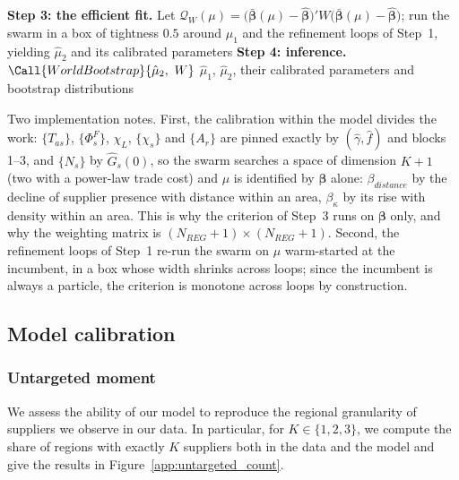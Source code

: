 \begin{algorithm}[H]
\begin{algorithmic}[1]
\vspace{3pt}
\State \textbf{Step 3: the efficient fit.} Let
  $\mathcal{Q}_W(\mu)=\bigl(\bar{\boldsymbol\beta}(\mu)-\hat{\boldsymbol\beta}\bigr)'W
  \bigl(\bar{\boldsymbol\beta}(\mu)-\hat{\boldsymbol\beta}\bigr)$; run the swarm in a box of tightness $0.5$ around $\hat\mu_1$ and the refinement loops of Step~1, yielding $\hat{\mu}_2$ and its calibrated parameters
\vspace{3pt}
\State \textbf{Step 4: inference.} $\Call{WorldBootstrap}{\hat\mu_2,\ W}$ 
\State \Return $\hat{\mu}_1$, $\hat{\mu}_2$, their calibrated parameters and bootstrap distributions
\end{algorithmic}
\end{algorithm}

Two implementation notes. First, the calibration within the model divides the work: $\{T_{as}\}$, $\{\Phi^F_s\}$, $\chi_L$, $\{\chi_s\}$ and $\{A_r\}$ are pinned exactly by $(\hat\gamma,\hat f)$ and blocks 1--3, and $\{N_s\}$ by $\hat G_s(0)$, so the swarm searches a space of dimension $K+1$ (two with a power-law trade cost) and $\mu$ is identified by $\boldsymbol\beta$ alone: $\beta_{distance}$ by the decline of supplier presence with distance within an area, $\beta_\kappa$ by its rise with density within an area. This is why the criterion of Step~3 runs on $\boldsymbol\beta$ only, and why the weighting matrix is $(N_{REG}+1)\times(N_{REG}+1)$. Second, the refinement loops of Step~1 re-run the swarm on $\mu$ warm-started at the incumbent, in a box whose width shrinks across loops; since the incumbent is always a particle, the criterion is monotone across loops by construction.


\subsection{Model calibration}

\subsubsection{Untargeted moment}

We assess the ability of our model to reproduce the regional granularity of suppliers we observe in our data. In particular, for $K \in \{1,2,3\}$, we compute the share of regions with exactly $K$ suppliers both in the data and the model and give the results in Figure~\ref{app:untargeted_count}.

